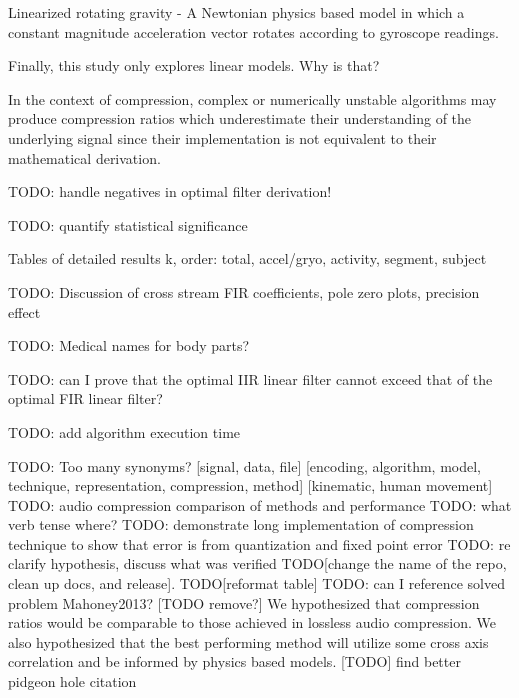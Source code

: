 \documentclass[journal]{IEEEtran}
\begin{document}
Linearized rotating gravity - A Newtonian physics based model in which a constant magnitude acceleration vector rotates according to gyroscope readings.

Finally, this study only explores linear models. Why is that?

 In the context of compression, complex or numerically unstable algorithms may produce compression ratios which underestimate their understanding of the underlying signal since their implementation is not equivalent to their mathematical derivation.

TODO: handle negatives in optimal filter derivation!

TODO: quantify statistical significance

Tables of detailed results k, order: total, accel/gryo, activity, segment, subject 

TODO: Discussion of cross stream FIR coefficients, pole zero plots, precision effect

TODO: Medical names for body parts?

TODO: can I prove that the optimal IIR linear filter cannot exceed that of the optimal FIR linear filter?

TODO: add algorithm execution time

TODO: Too many synonyms? [signal, data, file] [encoding, algorithm, model, technique, representation, compression, method] [kinematic, human movement]
TODO: audio compression comparison of methods and performance
TODO: what verb tense where?
TODO: demonstrate long implementation of compression technique to show that error is from quantization and fixed point error
TODO: re clarify hypothesis, discuss what was verified
TODO[change the name of the repo, clean up docs, and release]. 
TODO[reformat table]
TODO: can I reference solved problem Mahoney2013?
[TODO remove?]  We hypothesized that compression ratios would be comparable to those achieved in lossless audio compression. We also hypothesized that the best performing method will utilize some cross axis correlation and be informed by physics based models.
[TODO] find better pidgeon hole citation
\end{document}
